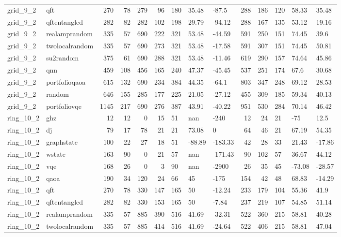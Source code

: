 \begin{longtable}{llrrrrlllrrlll}
grid\_9\_2 & qft & 270 & 78 & 279 & 96 & 180 & 35.48 & -87.5 & 288 & 186 & 120 & 58.33 & 35.48 \\
grid\_9\_2 & qftentangled & 282 & 82 & 282 & 102 & 198 & 29.79 & -94.12 & 288 & 167 & 135 & 53.12 & 19.16 \\
grid\_9\_2 & realamprandom & 335 & 57 & 690 & 222 & 321 & 53.48 & -44.59 & 591 & 250 & 151 & 74.45 & 39.6 \\
grid\_9\_2 & twolocalrandom & 335 & 57 & 690 & 273 & 321 & 53.48 & -17.58 & 591 & 307 & 151 & 74.45 & 50.81 \\
grid\_9\_2 & su2random & 375 & 61 & 690 & 288 & 321 & 53.48 & -11.46 & 619 & 290 & 157 & 74.64 & 45.86 \\
grid\_9\_2 & qnn & 459 & 108 & 456 & 165 & 240 & 47.37 & -45.45 & 537 & 251 & 174 & 67.6 & 30.68 \\
grid\_9\_2 & portfolioqaoa & 615 & 132 & 690 & 234 & 384 & 44.35 & -64.1 & 803 & 347 & 248 & 69.12 & 28.53 \\
grid\_9\_2 & random & 646 & 155 & 285 & 177 & 225 & 21.05 & -27.12 & 455 & 309 & 185 & 59.34 & 40.13 \\
grid\_9\_2 & portfoliovqe & 1145 & 217 & 690 & 276 & 387 & 43.91 & -40.22 & 951 & 530 & 284 & 70.14 & 46.42 \\
ring\_10\_2 & ghz & 12 & 12 & 0 & 15 & 51 & nan & -240 & 12 & 24 & 21 & -75 & 12.5 \\
ring\_10\_2 & dj & 79 & 17 & 78 & 21 & 21 & 73.08 & 0 & 64 & 46 & 21 & 67.19 & 54.35 \\
ring\_10\_2 & graphstate & 100 & 22 & 27 & 18 & 51 & -88.89 & -183.33 & 42 & 28 & 33 & 21.43 & -17.86 \\
ring\_10\_2 & wstate & 163 & 90 & 0 & 21 & 57 & nan & -171.43 & 90 & 102 & 57 & 36.67 & 44.12 \\
ring\_10\_2 & vqe & 168 & 26 & 0 & 3 & 90 & nan & -2900 & 26 & 35 & 45 & -73.08 & -28.57 \\
ring\_10\_2 & qaoa & 190 & 34 & 120 & 24 & 66 & 45 & -175 & 154 & 42 & 48 & 68.83 & -14.29 \\
ring\_10\_2 & qft & 270 & 78 & 330 & 147 & 165 & 50 & -12.24 & 233 & 179 & 104 & 55.36 & 41.9 \\
ring\_10\_2 & qftentangled & 282 & 82 & 330 & 153 & 165 & 50 & -7.84 & 237 & 219 & 107 & 54.85 & 51.14 \\
ring\_10\_2 & realamprandom & 335 & 57 & 885 & 390 & 516 & 41.69 & -32.31 & 522 & 360 & 215 & 58.81 & 40.28 \\
ring\_10\_2 & twolocalrandom & 335 & 57 & 885 & 414 & 516 & 41.69 & -24.64 & 522 & 406 & 215 & 58.81 & 47.04 \\

\end{longtable}
